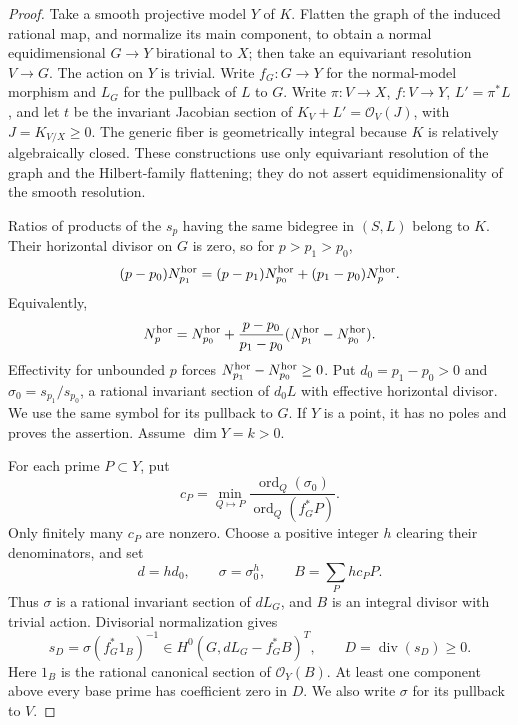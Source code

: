 \begin{proof}
Take a smooth projective model $Y$ of $K$.  Flatten the graph of the
induced rational map, and normalize its main component, to obtain a
normal equidimensional $G\to Y$ birational to $X$; then take an
equivariant resolution $V\to G$.  The action on $Y$ is trivial. Write $f_G:G\to Y$ for the normal-model morphism and $L_G$ for the pullback of $L$ to $G$.
Write $\pi:V\to X$, $f:V\to Y$, $L'=\pi^*L$, and let
$t$ be the invariant Jacobian section of
$K_V+L'=\mathcal O_V(J)$, with $J=K_{V/X}\ge0$.
The generic fiber is geometrically integral because $K$ is relatively
algebraically closed.  These constructions use only equivariant
resolution of the graph and the Hilbert-family flattening; they do
not assert equidimensionality of the smooth resolution.

Ratios of products of the $s_p$ having the same bidegree in $(S,L)$
belong to $K$.  Their horizontal divisor on $G$ is zero, so for
$p>p_1>p_0$,
\[
 (p-p_0)N_{p_1}^{\rm hor}
 =(p-p_1)N_{p_0}^{\rm hor}+(p_1-p_0)N_p^{\rm hor}.
\]
Equivalently,
\[
 N_p^{\rm hor}=N_{p_0}^{\rm hor}
 +\frac{p-p_0}{p_1-p_0}
       (N_{p_1}^{\rm hor}-N_{p_0}^{\rm hor}).
\]
Effectivity for unbounded $p$ forces
$N_{p_1}^{\rm hor}-N_{p_0}^{\rm hor}\ge0$.
Put $d_0=p_1-p_0>0$ and
$\sigma_0=s_{p_1}/s_{p_0}$, a rational invariant section of
$d_0L$ with effective horizontal divisor. We use the same symbol
for its pullback to $G$. If $Y$ is a point, it has no poles and
proves the assertion. Assume $\dim Y=k>0$.

For each prime $P\subset Y$, put
\[
 c_P=\min_{Q\mapsto P}
       \frac{\operatorname{ord}_Q(\sigma_0)}
            {\operatorname{ord}_Q(f_G^*P)}.
\]
Only finitely many $c_P$ are nonzero. Choose a positive integer $h$
clearing their denominators, and set
\[
 d=hd_0,\qquad \sigma=\sigma_0^h,\qquad
 B=\sum_P h c_P P.
\]
Thus $\sigma$ is a rational invariant section of $dL_G$, and $B$
is an integral divisor with trivial action. Divisorial normalization
gives
\begin{equation}\label{inj:invariant-base-decomposition}
 s_D=\sigma(f_G^*1_B)^{-1}
     \in H^0(G,dL_G-f_G^*B)^T,
 \qquad D=\operatorname{div}(s_D)\ge0.
\end{equation}
Here $1_B$ is the rational canonical section of $\mathcal O_Y(B)$.
At least one component above every base prime has coefficient zero
in $D$. We also write $\sigma$ for its pullback to $V$.


\end{proof}
